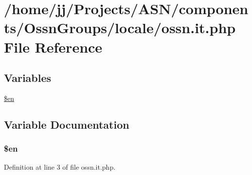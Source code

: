 \hypertarget{components_2_ossn_groups_2locale_2ossn_8it_8php}{}\section{/home/jj/\+Projects/\+A\+S\+N/components/\+Ossn\+Groups/locale/ossn.it.\+php File Reference}
\label{components_2_ossn_groups_2locale_2ossn_8it_8php}
\subsection*{Variables}
\begin{DoxyCompactItemize}
\item 
\hyperlink{components_2_ossn_groups_2locale_2ossn_8it_8php_a48abc714dfb71c8fffa83cf49f452115}{\$en}
\end{DoxyCompactItemize}


\subsection{Variable Documentation}
\subsubsection[{\texorpdfstring{\$en}{$en}}]{\setlength{\rightskip}{0pt plus 5cm}\$en}\hypertarget{components_2_ossn_groups_2locale_2ossn_8it_8php_a48abc714dfb71c8fffa83cf49f452115}{}\label{components_2_ossn_groups_2locale_2ossn_8it_8php_a48abc714dfb71c8fffa83cf49f452115}


Definition at line 3 of file ossn.\+it.\+php.

